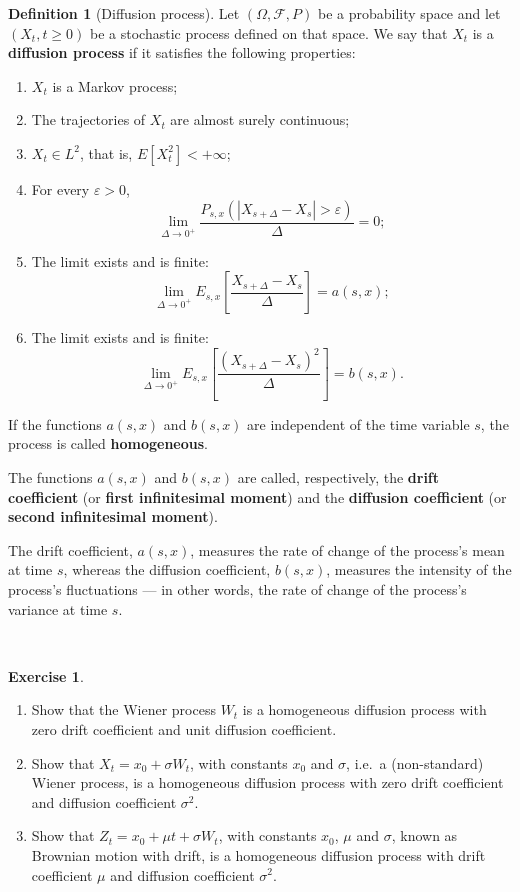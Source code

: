 \documentclass[
  11pt,
  a4paper,
]{book}
\theoremstyle{definition}
\newtheorem{definition}{Definition}[chapter]
\theoremstyle{definition}
\theoremstyle{definition}
\newtheorem{exercise}{Exercise}[chapter]
\theoremstyle{definition}
\theoremstyle{remark}
\begin{document}
\begin{definition}[Diffusion process]
Let \((\Omega,\mathcal{F},P)\) be a probability space and let \((X_t, t \geq 0)\) be a stochastic process defined on that space. We say that \(X_t\) is a \textbf{diffusion process} if it satisfies the following properties:

\begin{enumerate}
\def\labelenumi{\roman{enumi})}
\item
  \(X_t\) is a Markov process;
\item
  The trajectories of \(X_t\) are almost surely continuous;
\item
  \(X_t \in L^2\), that is, \(E[X_t^2] < +\infty\);
\item
  For every \(\varepsilon > 0\),
  \[
  \lim_{\Delta \to 0^+} \frac{P_{s,x}(|X_{s+\Delta} - X_s| > \varepsilon)}{\Delta} = 0;
  \]
\item
  The limit exists and is finite:
  \[
  \lim_{\Delta \to 0^+} E_{s,x}\left[\frac{X_{s+\Delta} - X_s}{\Delta}\right] = a(s,x);
  \]
\item
  The limit exists and is finite:
  \[
  \lim_{\Delta \to 0^+} E_{s,x}\left[\frac{(X_{s+\Delta} - X_s)^2}{\Delta}\right] = b(s,x).
  \]
\end{enumerate}

If the functions \(a(s,x)\) and \(b(s,x)\) are independent of the time variable \(s\), the process is called \textbf{homogeneous}.

The functions \(a(s,x)\) and \(b(s,x)\) are called, respectively, the \textbf{drift coefficient} (or \textbf{first infinitesimal moment}) and the \textbf{diffusion coefficient} (or \textbf{second infinitesimal moment}).

The drift coefficient, \(a(s,x)\), measures the rate of change of the process's mean at time \(s\), whereas the diffusion coefficient, \(b(s,x)\), measures the intensity of the process's fluctuations --- in other words, the rate of change of the process's variance at time \(s\).
\end{definition}

\(\,\)

\begin{exercise}
\leavevmode

\begin{enumerate}
\def\labelenumi{(\roman{enumi})}
\item
  Show that the Wiener process \(W_t\) is a homogeneous diffusion process with zero drift coefficient and unit diffusion coefficient.
\item
  Show that \(X_t = x_0 + \sigma W_t\), with constants \(x_0\) and \(\sigma\), i.e.~a (non-standard) Wiener process, is a homogeneous diffusion process with zero drift coefficient and diffusion coefficient \(\sigma^2\).
\item
  Show that \(Z_t = x_0 + \mu t + \sigma W_t\), with constants \(x_0\), \(\mu\) and \(\sigma\), known as Brownian motion with drift, is a homogeneous diffusion process with drift coefficient \(\mu\) and diffusion coefficient \(\sigma^2\).
\end{enumerate}

\end{exercise}
\end{document}
